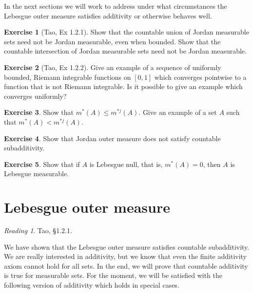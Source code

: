 \documentclass[10pt,oneside]{amsbook}
\theoremstyle{definition}
\newtheorem{exerc}{Exercise}[section]
\theoremstyle{plain}
\theoremstyle{definition}
\theoremstyle{remark}
\newtheorem*{reading}{Reading}
\numberwithin{equation}{section}
\numberwithin{figure}{section}
\begin{document}
In the next sections we will work to address under what circumstances the Lebesgue outer measure satisfies additivity or otherwise behaves well.

\begin{exerc}[Tao, Ex 1.2.1]
  Show that the countable union of Jordan measurable sets need not be Jordan measurable, even when bounded. Show that the countable intersection of Jordan measurable sets need not be Jordan measurable.
\end{exerc}

\begin{exerc}[Tao, Ex 1.2.2]
  Give an example of a sequence of uniformly bounded, Riemann integrable functions on $[0,1]$ which converges pointwise to a function that is not Riemann integrable. Is it possible to give an example which converges uniformly?
\end{exerc}

\begin{exerc}
  Show that $m^*(A)\leq m^{*j}(A)$. Give an example of a set $A$ such that $m^*(A)<m^{*j}(A)$.
\end{exerc}

\begin{exerc}
  Show that Jordan outer measure does not satisfy countable subadditivity.
\end{exerc}

\begin{exerc}
  Show that if $A$ is Lebesgue null, that is, $m^*(A)=0$, then $A$ is Lebesgue measurable.
\end{exerc}


\newpage
\section{Lebesgue outer measure}

\begin{reading}
  Tao, \S 1.2.1.
\end{reading}

We have shown that the Lebesgue outer measure satisfies countable subadditivity. We are really interested in additivity, but we know that even the finite additivity axiom cannot hold for all sets. In the end, we will prove that countable additivity is true for measurable sets. For the moment, we will be satisfied with the following version of additivity which holds in special cases.
\end{document}
